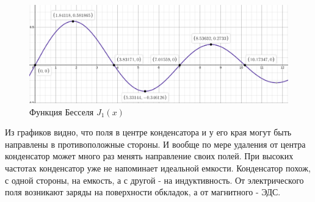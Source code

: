 \begin{figure}[h!]
    \centering
    \includegraphics[width=14cm]{images/bessel_j1.png}
    \caption{Функция Бесселя $J_1(x)$}
\end{figure}
\newpage

\indent
Из графиков видно, что поля в центре конденсатора и у его края могут быть направлены в противоположные стороны. И вообще по мере удаления от центра конденсатор может много раз менять направление своих полей. При высоких частотах конденсатор уже не напоминает идеальной емкости. Конденсатор похож, с одной стороны, на емкость, а с другой - на индуктивность. От электрического поля возникают заряды на поверхности обкладок, а от магнитного - ЭДС.

